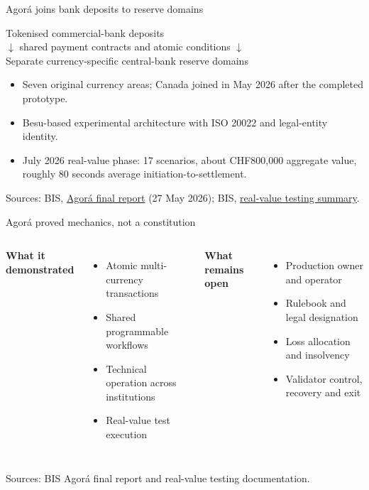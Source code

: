 \documentclass[aspectratio=169,12pt]{beamer}
\newcommand{\rust}[1]{\textcolor{Rust}{\textbf{#1}}}
\newcommand{\blue}[1]{\textcolor{Ocean}{\textbf{#1}}}
\newcommand{\source}[1]{\vfill\par\fontsize{5.4}{6.5}\selectfont\color{Quiet}Sources: #1}
\newcommand{\tightitems}{\setlength{\itemsep}{0.42em}\setlength{\parskip}{0pt}}
\begin{document}
\begin{frame}{Agor\'a joins bank deposits to reserve domains}
  \begin{center}
    \fontsize{13}{15.5}\selectfont
    Tokenised commercial-bank deposits \\
    \vspace{0.18cm}
    $\downarrow$ \quad shared payment contracts and atomic conditions \quad $\downarrow$ \\
    \vspace{0.18cm}
    Separate currency-specific central-bank reserve domains
  \end{center}
  \vspace{0.32cm}
  \begin{itemize}\tightitems
    \item Seven original currency areas; Canada joined in May 2026 after the completed prototype.
    \item Besu-based experimental architecture with ISO 20022 and legal-entity identity.
    \item July 2026 real-value phase: 17 scenarios, about CHF800,000 aggregate value, roughly 80 seconds average initiation-to-settlement.
  \end{itemize}
  \source{BIS, \href{https://www.bis.org/publ/othp110.pdf}{Agor\'a final report} (27 May 2026); BIS, \href{https://www.bis.org/about/bisih/topics/fmis/agora/rvt.htm}{real-value testing summary}.}
\end{frame}

\begin{frame}{Agor\'a proved mechanics, not a constitution}
  \begin{columns}[T,onlytextwidth]
      \rust{What it demonstrated}
      \begin{itemize}\tightitems
        \item Atomic multi-currency transactions
        \item Shared programmable workflows
        \item Technical operation across institutions
        \item Real-value test execution
      \end{itemize}
      \blue{What remains open}
      \begin{itemize}\tightitems
        \item Production owner and operator
        \item Rulebook and legal designation
        \item Loss allocation and insolvency
        \item Validator control, recovery and exit
      \end{itemize}
  \end{columns}
  \source{BIS Agor\'a final report and real-value testing documentation.}
\end{frame}
\end{document}
